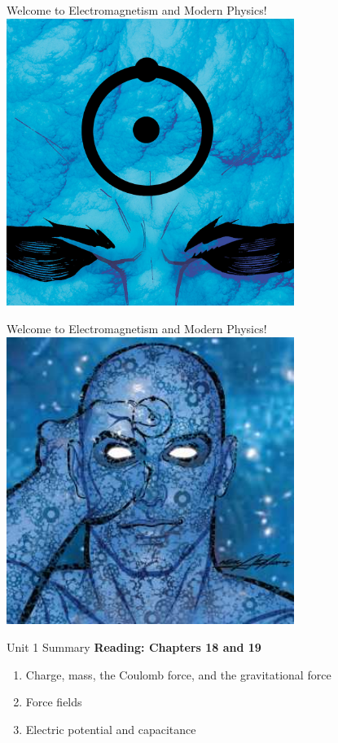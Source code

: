 \documentclass{beamer}
\begin{document}
\begin{frame}{Welcome to Electromagnetism and Modern Physics!}
\centering
\includegraphics[width=0.7\textwidth]{figures/manhattan.jpg}
\end{frame}

\begin{frame}{Welcome to Electromagnetism and Modern Physics!}
\centering
\includegraphics[width=0.7\textwidth]{figures/manhattan2.jpg}
\end{frame}

\begin{frame}{Unit 1 Summary}
\textbf{Reading: Chapters 18 and 19}
\begin{enumerate}
\item Charge, mass, the Coulomb force, and the gravitational force
\item Force fields
\item Electric potential and capacitance
\end{enumerate}
\end{frame}
\end{document}
